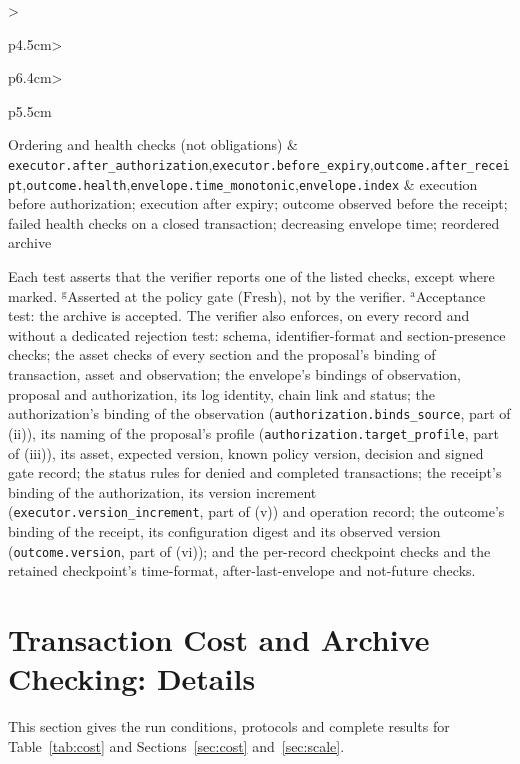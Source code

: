 \documentclass[journal]{IEEEtran}
\newcommand{\Fresh}{\mathrm{Fresh}}
\newcommand{\code}[1]{\texttt{\footnotesize #1}}
\begin{document}
\begin{table}[!t]
\begin{tabular}{>{\raggedright\arraybackslash}p{4.5cm}>{\raggedright\arraybackslash}p{6.4cm}>{\raggedright\arraybackslash}p{5.5cm}}
\midrule
Ordering and health checks (not obligations) & \code{executor.after\_authorization},\newline \code{executor.before\_expiry},\newline \code{outcome.after\_receipt},\newline \code{outcome.health},\newline \code{envelope.time\_monotonic},\newline \code{envelope.index} & execution before authorization; execution after expiry; outcome observed before the receipt; failed health checks on a closed transaction; decreasing envelope time; reordered archive \\
\bottomrule
\end{tabular}
\par\smallskip\parbox{\linewidth}{\footnotesize\raggedright Each test asserts that the verifier reports one of the listed checks, except where marked. $^{\mathrm{g}}$Asserted at the policy gate ($\Fresh$), not by the verifier. $^{\mathrm{a}}$Acceptance test: the archive is accepted. The verifier also enforces, on every record and without a dedicated rejection test: schema, identifier-format and section-presence checks; the asset checks of every section and the proposal's binding of transaction, asset and observation; the envelope's bindings of observation, proposal and authorization, its log identity, chain link and status; the authorization's binding of the observation (\code{authorization.binds\_source}, part of (ii)), its naming of the proposal's profile (\code{authorization.target\_profile}, part of (iii)), its asset, expected version, known policy version, decision and signed gate record; the status rules for denied and completed transactions; the receipt's binding of the authorization, its version increment (\code{executor.version\_increment}, part of (v)) and operation record; the outcome's binding of the receipt, its configuration digest and its observed version (\code{outcome.version}, part of (vi)); and the per-record checkpoint checks and the retained checkpoint's time-format, after-last-envelope and not-future checks.}
\end{table}

\section{Transaction Cost and Archive Checking: Details}
\label{s:costs}
This section gives the run conditions, protocols and complete results for Table~\ref{tab:cost} and Sections~\ref{sec:cost} and~\ref{sec:scale}.
\end{document}
